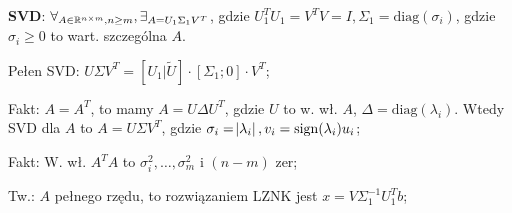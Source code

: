 
\entry
\textbf{SVD}:
$\forall_{A \in \mathbb{R}^{n\times m}, n \geq m}, \exists_{A=U_1\Sigma_1V^T}$, gdzie
$U_1^TU_1=V^TV=I, \Sigma_1 = \mathrm{diag}(\sigma_i)$, gdzie
$\sigma_i \geq 0$ to wart. szczególna $A$.

\entry
Pełen SVD:
$U\Sigma V^T=[U_1|\tilde{U}] \cdot [\Sigma_1; 0] \cdot V^T$;

\entry
Fakt:
$A=A^T$, to mamy $A=U\Delta U^T$, gdzie $U$ to w. wł. $A$,
$\Delta= \mathrm{diag}(\lambda_i)$.
Wtedy SVD dla $A$ to $A=U\Sigma V^T$, gdzie
$\sigma_i=\abs{\lambda_i}, v_i=\mathrm{sign}(\lambda_i)u_i$;

\entry
Fakt:
W. wł. $A^TA$ to $\sigma_i^2,\ldots,\sigma_m^2$ i $(n-m)$ zer;

\entry
Tw.:
$A$ pełnego rzędu, to rozwiązaniem LZNK jest $x=V\Sigma_1^{-1}U_1^Tb$;

